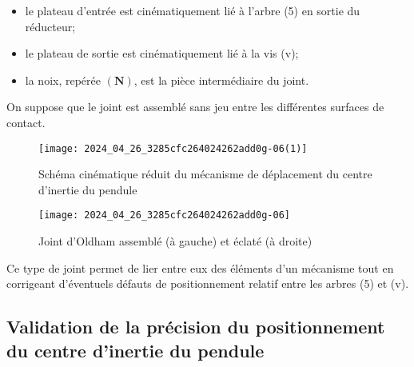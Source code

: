 \begin{itemize}
  \item le plateau d'entrée est cinématiquement lié à l'arbre (5) en sortie du réducteur;
  \item le plateau de sortie est cinématiquement lié à la vis (v);
  \item la noix, repérée $(\mathbf{N})$, est la pièce intermédiaire du joint.
\end{itemize}

On suppose que le joint est assemblé sans jeu entre les différentes surfaces de contact.

\begin{figure}[!h]
\centering
\texttt{[image: 2024\_04\_26\_3285cfc264024262add0g-06(1)]}
\caption{\label{ccmp2023_fig_06} Schéma cinématique réduit du mécanisme de déplacement du centre d'inertie du pendule}
\end{figure}

\begin{figure}[!h]
\centering
\texttt{[image: 2024\_04\_26\_3285cfc264024262add0g-06]}
\caption{\label{ccmp2023_fig_07} Joint d'Oldham assemblé (à gauche) et éclaté (à droite)}
\end{figure}



Ce type de joint permet de lier entre eux des éléments d'un mécanisme tout en corrigeant d'éventuels défauts de positionnement relatif entre les arbres (5) et (v).




\subsection{Validation de la précision du positionnement du centre d'inertie du pendule}

